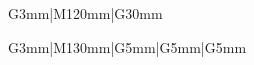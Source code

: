 \begin{longtable}{G{3mm}|M{120mm}|G{30mm}}
\begin{longtable}{G{3mm}|M{130mm}|G{5mm}|G{5mm}|G{5mm}}
%




\end{longtable}
\end{longtable}
